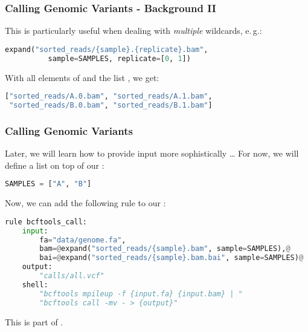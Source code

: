 \begin{frame}[fragile]
 \frametitle{Calling Genomic Variants - Background II}
 This is particularly useful when dealing with \emph{multiple} wildcards, e.\,g.:
 \begin{lstlisting}[language=Python,style=Python]
expand("sorted_reads/{sample}.{replicate}.bam", 
          sample=SAMPLES, replicate=[0, 1])
 \end{lstlisting}
 With all elements of  and the list \altverb{[0, 1]}, we get:
 \begin{lstlisting}[language=Python,style=Python]
["sorted_reads/A.0.bam", "sorted_reads/A.1.bam", 
 "sorted_reads/B.0.bam", "sorted_reads/B.1.bam"]
 \end{lstlisting}
\end{frame}
  
\begin{frame}[fragile]
  \frametitle{Calling Genomic Variants}
  Later, we will learn how to provide input more sophistically \ldots\newline
  For now, we will define a list on top of our :
  \begin{lstlisting}[language=Python,style=Python]
SAMPLES = ["A", "B"]
  \end{lstlisting}
  Now, we can add the following rule to our :
  \begin{lstlisting}[language=Python,style=Python,basicstyle=\footnotesize]
rule bcftools_call:
    input:
        fa="data/genome.fa",
        bam=@expand("sorted_reads/{sample}.bam", sample=SAMPLES),@
        bai=@expand("sorted_reads/{sample}.bam.bai", sample=SAMPLES)@
    output:
        "calls/all.vcf"
    shell:
        "bcftools mpileup -f {input.fa} {input.bam} | "
        "bcftools call -mv - > {output}"
  \end{lstlisting}
  This is part of .
\end{frame}



